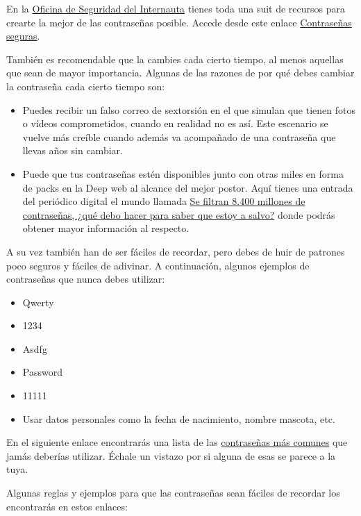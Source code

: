 \documentclass[
  spanish,
  a4paper,
  openany]{book}
\begin{document}
En la \href{https://www.osi.es/es}{Oficina de Seguridad del Internauta} tienes toda una suit de recursos para crearte la mejor de las contraseñas posible. Accede desde este enlace \href{https://www.osi.es/es/campanas/contrasenas-seguras}{Contraseñas seguras}.

También es recomendable que la cambies cada cierto tiempo, al menos aquellas que sean de mayor importancia. Algunas de las razones de por qué debes cambiar la contraseña cada cierto tiempo son:

\begin{itemize}
\item
  Puedes recibir un falso correo de sextorsión en el que simulan que tienen fotos o vídeos comprometidos, cuando en realidad no es así. Este escenario se vuelve más creíble cuando además va acompañado de una contraseña que llevas años sin cambiar.
\item
  Puede que tus contraseñas estén disponibles junto con otras miles en forma de packs en la Deep web al alcance del mejor postor. Aquí tienes una entrada del periódico digital el mundo llamada \href{https://www.elmundo.es/tecnologia/2021/06/08/60bf3b2a21efa0ae7f8b462e.html}{Se filtran 8.400 millones de contraseñas, ¿qué debo hacer para saber que estoy a salvo?} donde podrás obtener mayor información al respecto.
\end{itemize}

A su vez también han de ser fáciles de recordar, pero debes de huir de patrones poco seguros y fáciles de adivinar. A continuación, algunos ejemplos de contraseñas que nunca debes utilizar:

\begin{itemize}
\item
  Qwerty
\item
  1234
\item
  Asdfg
\item
  Password
\item
  11111
\item
  Usar datos personales como la fecha de nacimiento, nombre mascota, etc.
\end{itemize}

En el siguiente enlace encontrarás una lista de las \href{https://nordpass.com/most-common-passwords-list/}{contraseñas más comunes} que jamás deberías utilizar. Échale un vistazo por si alguna de esas se parece a la tuya.

Algunas reglas y ejemplos para que las contraseñas sean fáciles de recordar los encontrarás en estos enlaces:
\end{document}
